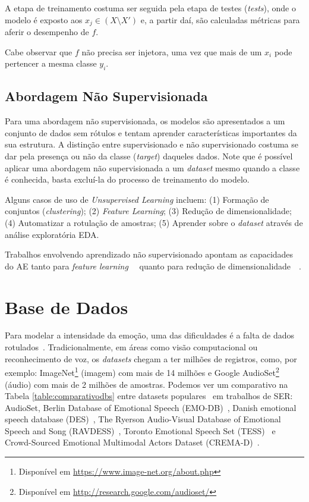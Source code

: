 A etapa de treinamento costuma ser seguida pela etapa de testes (\textit{tests}), onde o modelo é exposto aos $x_j \in (X \setminus X')$ e, a partir daí, são calculadas métricas para aferir o desempenho de $f$.

Cabe observar que $f$ não precisa ser injetora, uma vez que mais de um $x_i$ pode pertencer a mesma classe $y_i$.

\subsection{Abordagem Não Supervisionada}

Para uma abordagem não supervisionada, os modelos são apresentados a um conjunto de dados sem rótulos e tentam aprender características importantes da sua estrutura. A distinção entre supervisionado e não supervisionado costuma se dar pela presença ou não da classe (\textit{target}) daqueles dados. Note que é possível aplicar uma abordagem não supervisionada a um \textit{dataset} mesmo quando a classe é conhecida, basta excluí-la do processo de treinamento do modelo.

Alguns casos de uso de \textit{Unsupervised Learning} incluem: (1) Formação de conjuntos (\textit{clustering}); (2) \textit{Feature Learning}; (3) Redução de dimensionalidade; (4) Automatizar a rotulação de amostras; (5) Aprender sobre o \textit{dataset} através de análise exploratória \acrlong{EDA}.

Trabalhos envolvendo aprendizado não supervisionado apontam as capacidades do \acrshort{AE} tanto para \textit{feature learning}~\cite{35.16}~\cite{35.17} quanto para redução de dimensionalidade~\cite{35.18}~\cite{35.19}.

\section{Base de Dados}\label{section:basesdedados}

Para modelar a intensidade da emoção, uma das dificuldades é a falta de dados rotulados~\cite{18}. Tradicionalmente, em áreas como visão computacional ou reconhecimento de voz, os \textit{datasets} chegam a ter milhões de registros, como, por exemplo: ImageNet\footnote{Disponível em \url{https://www.image-net.org/about.php}} (imagem) com  mais de 14 milhões e Google AudioSet\footnote{Disponível em \url{http://research.google.com/audioset/}} (áudio) com mais de 2 milhões de amostras. Podemos ver um comparativo na Tabela \ref{table:comparativodbs} entre datasets populares~\cite{32} em trabalhos de \acrshort{SER}: AudioSet, Berlin Database of Emotional Speech (EMO-DB)~\cite{32.55}, Danish emotional speech database (DES)~\cite{32.56}, The Ryerson Audio-Visual Database of Emotional Speech and Song (RAVDESS)~\cite{32.57}, Toronto Emotional Speech Set (TESS)~\cite{32.58} e Crowd-Sourced Emotional Multimodal Actors Dataset (CREMA-D)~\cite{32.59}.

